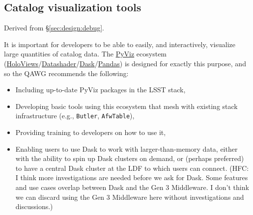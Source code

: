 \subsection{Catalog visualization tools}


Derived from \S\ref{sec:design:debug}.

It is important for developers to be able to easily, and interactively, visualize large quantities of catalog data.
The \href{http://pyviz.org}{PyViz} ecosystem (\href{http://holoviews.org}{HoloViews}/\href{http://datashader.org}{Datashader}/\href{http://dask.pydata.org}{Dask}/\href{http://pandas.pydata.org}{Pandas}) is designed for exactly this purpose, and so the QAWG recommends the following:
\begin{itemize}
    \item{Including up-to-date PyViz packages in the LSST stack,}
    \item{Developing basic tools using this ecosystem that mesh with existing stack infrastructure (e.g., \texttt{Butler}, \texttt{AfwTable}),}
    \item{Providing training to developers on how to use it,}
    \item{Enabling users to use Dask to work with larger-than-memory data, either with the ability to spin up Dask clusters on demand, or (perhaps preferred) to have a central Dask cluster at the LDF to which users can connect. (HFC: I think more investigations are needed before we ask for Dask.  Some features and use cases overlap between Dask and the Gen 3 Middleware. I don't think we can discard using the Gen 3 Middleware here without investigations and discussions.)}
\end{itemize}
